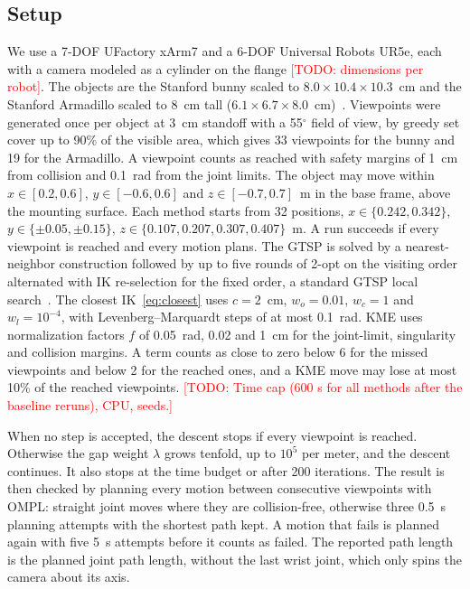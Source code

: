 \documentclass[letterpaper, journal, twoside]{IEEEtran}
\DeclareRobustCommand{\todo}[1]{\textcolor{red}{[TODO: #1]}}  %
\begin{document}
\subsection{Setup}
We use a 7-DOF UFactory xArm7 and a 6-DOF Universal Robots UR5e, each with a camera modeled as a cylinder on the flange \todo{dimensions per robot}. The objects are the Stanford bunny scaled to $8.0 \times 10.4 \times 10.3$~cm and the Stanford Armadillo scaled to 8~cm tall ($6.1 \times 6.7 \times 8.0$~cm)~\cite{stanford3dscan}. Viewpoints were generated once per object at 3~cm standoff with a 55$^\circ$ field of view, by greedy set cover up to 90\% of the visible area, which gives 33 viewpoints for the bunny and 19 for the Armadillo. A viewpoint counts as reached with safety margins of 1~cm from collision and 0.1~rad from the joint limits. The object may move within $x \in [0.2, 0.6]$, $y \in [-0.6, 0.6]$ and $z \in [-0.7, 0.7]$~m in the base frame, above the mounting surface. Each method starts from 32 positions, $x \in \{0.242, 0.342\}$, $y \in \{\pm 0.05, \pm 0.15\}$, $z \in \{0.107, 0.207, 0.307, 0.407\}$~m. A run succeeds if every viewpoint is reached and every motion plans. The GTSP is solved by a nearest-neighbor construction followed by up to five rounds of 2-opt on the visiting order alternated with IK re-selection for the fixed order, a standard GTSP local search~\cite{hu2008gtsp,gutin2010memetic}. The closest IK~\eqref{eq:closest} uses $c = 2$~cm, $w_o = 0.01$, $w_c = 1$ and $w_l = 10^{-4}$, with Levenberg--Marquardt steps of at most 0.1~rad. KME uses normalization factors $f$ of 0.05~rad, 0.02 and 1~cm for the joint-limit, singularity and collision margins. A term counts as close to zero below 6 for the missed viewpoints and below 2 for the reached ones, and a KME move may lose at most 10\% of the reached viewpoints. \todo{Time cap (600 s for all methods after the baseline reruns), CPU, seeds.}

When no step is accepted, the descent stops if every viewpoint is reached. Otherwise the gap weight $\lambda$ grows tenfold, up to $10^5$ per meter, and the descent continues. It also stops at the time budget or after 200 iterations. The result is then checked by planning every motion between consecutive viewpoints with OMPL: straight joint moves where they are collision-free, otherwise three 0.5~s planning attempts with the shortest path kept. A motion that fails is planned again with five 5~s attempts before it counts as failed. The reported path length is the planned joint path length, without the last wrist joint, which only spins the camera about its axis.
\end{document}

